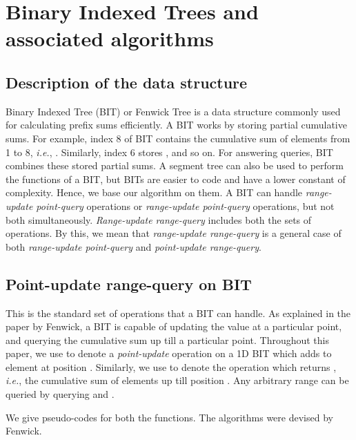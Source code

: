 \documentclass[a4paper]{article}
\begin{document}
\section{Binary Indexed Trees and associated algorithms}
\subsection{Description of the data structure}
Binary Indexed Tree (BIT) or Fenwick Tree\cite{BIT} is a data structure commonly used for calculating prefix sums efficiently. A BIT works by storing partial cumulative sums. For example, index 8 of BIT contains the cumulative sum of elements from 1 to 8, \textit{i.e.}, . Similarly, index 6 stores , and so on. For answering queries, BIT combines these stored partial sums. A segment tree can also be used to perform the functions of a BIT, but BITs are easier to code and have a lower constant of complexity. Hence, we base our algorithm on them. A BIT can handle \textit{range-update point-query} operations or \textit{range-update point-query} operations, but not both simultaneously. \textit{Range-update range-query} includes both the sets of operations. By this, we mean that \textit{range-update range-query} is a general case of both \textit{range-update point-query} and \textit{point-update range-query}.



\subsection{Point-update range-query on BIT}
This is the standard set of operations that a BIT can handle. As explained in the paper by Fenwick\cite{BIT}, a BIT is capable of updating the value at a particular point, and querying the cumulative sum up till a particular point. Throughout this paper, we use  to denote a \textit{point-update} operation on a 1D BIT  which adds  to element at position . Similarly, we use  to denote the operation which returns , \textit{i.e.}, the cumulative sum of elements up till position . Any arbitrary range  can be queried by querying  and .

\vspace{2 mm}
We give pseudo-codes for both the functions. The algorithms were devised by Fenwick\cite{BIT}.

\vspace {3 mm}
\noindent
{}
\begin{algorithmic}[1]

        \State 
        \While {}
            \State 
            \State 
        \EndWhile
\EndFunction
\end{algorithmic}
\end{document}
